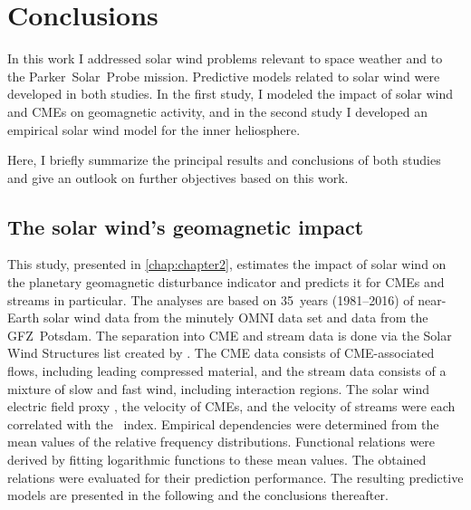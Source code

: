 
\chapter{Conclusions}
\label{chap:summary}

In this work I addressed solar wind problems relevant to space weather and to the Parker~Solar~Probe mission. Predictive models related to solar wind were developed in both studies. In the first study, I modeled the impact of solar wind and CMEs on geomagnetic activity, and in the second study I developed an empirical solar wind model for the inner heliosphere.

Here, I briefly summarize the principal results and conclusions of both studies and give an outlook on further objectives based on this work.

\section{The solar wind's geomagnetic impact}
This study, presented in \autoref{chap:chapter2}, estimates the impact of solar wind on the planetary geomagnetic disturbance indicator \Kp{} and predicts it for CMEs and streams in particular.
The analyses are based on 35~years (1981--2016) of near-Earth solar wind data from the minutely OMNI data set and \Kp{} data from the GFZ~Potsdam. The separation into CME and stream data is done via the Solar Wind Structures list created by \citet{Richardson2000}. The CME data consists of CME-associated flows, including leading compressed material, and the stream data consists of a mixture of slow and fast wind, including interaction regions. The solar wind electric field proxy \vBz{}, the velocity of CMEs, and the velocity of streams were each correlated with the \Kp~index. Empirical dependencies were determined from the mean values of the relative \Kp{} frequency distributions. Functional relations were derived by fitting logarithmic functions to these mean \Kp{} values.
The obtained \Kp{} relations were evaluated for their prediction performance. The resulting predictive models are presented in the following and the conclusions thereafter.

\medskip

